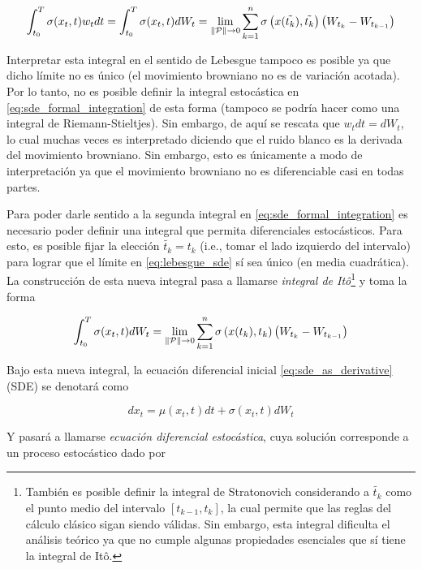 \begin{equation}
    \int_{t_0}^T \sigma(x_t,t)w_t dt = \int_{t_0}^T \sigma(x_t,t) dW_t = \lim_{\left\lVert \mathcal{P} \right\rVert\to 0} \sum_{k=1}^n \sigma\left(x(\tilde{t_k}),\tilde{t_k}\right) \left(W_{t_k} - W_{t_{k-1}}\right)
    \label{eq:lebesgue_sde}
\end{equation}

Interpretar esta integral en el sentido de Lebesgue tampoco es posible ya que dicho límite no es único (el movimiento browniano no es de variación acotada). Por lo tanto, no es posible definir la integral estocástica en \eqref{eq:sde_formal_integration} de esta forma (tampoco se podría hacer como una integral de Riemann-Stieltjes). Sin embargo, de aquí se rescata que $w_t dt = dW_t$, lo cual muchas veces es interpretado diciendo que el ruido blanco es la derivada del movimiento browniano. Sin embargo, esto es únicamente a modo de interpretación ya que el movimiento browniano no es diferenciable casi en todas partes.

Para poder darle sentido a la segunda integral en \eqref{eq:sde_formal_integration} es necesario poder definir una integral que permita diferenciales estocásticos. Para esto,
es posible fijar la elección $\tilde{t_k} = t_k$ (i.e., tomar el lado izquierdo del intervalo) para lograr que el límite en \eqref{eq:lebesgue_sde} sí sea único (en media cuadrática). La construcción de esta nueva integral pasa a llamarse \textit{integral de Itô}\footnote{También es posible definir la integral de Stratonovich considerando a $\tilde{t_k}$ como el punto medio del intervalo $[t_{k-1}, t_k]$, la cual permite que las reglas del cálculo clásico sigan siendo válidas. Sin embargo, esta integral dificulta el análisis teórico ya que no cumple algunas propiedades esenciales que sí tiene la integral de Itô.} y toma la forma

\begin{equation}
    \int_{t_0}^T \sigma(x_t,t) dW_t = \lim_{\left\lVert \mathcal{P} \right\rVert\to 0} \sum_{k=1}^n \sigma\left(x(t_k),t_k\right) \left(W_{t_k} - W_{t_{k-1}}\right)
\end{equation}

Bajo esta nueva integral, la ecuación diferencial inicial \eqref{eq:sde_as_derivative} (SDE) se denotará como

\begin{equation}
    dx_t = \mu(x_t,t)dt + \sigma(x_t,t)dW_t
    \label{eq:sde}
\end{equation}

Y pasará a llamarse \textit{ecuación diferencial estocástica}, cuya solución corresponde a un proceso estocástico dado por

